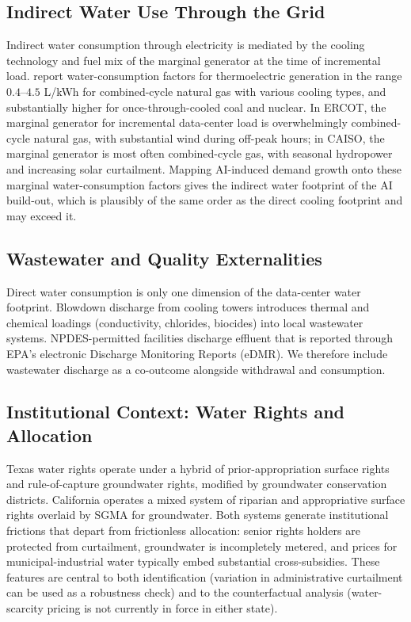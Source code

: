 \documentclass[11pt, letterpaper]{article}
\begin{document}
\subsection{Indirect Water Use Through the Grid}

Indirect water consumption through electricity is mediated by the cooling technology and fuel mix of the marginal generator at the time of incremental load. \citet{jin2019water} report water-consumption factors for thermoelectric generation in the range $0.4$--$4.5$ L/kWh for combined-cycle natural gas with various cooling types, and substantially higher for once-through-cooled coal and nuclear. In ERCOT, the marginal generator for incremental data-center load is overwhelmingly combined-cycle natural gas, with substantial wind during off-peak hours; in CAISO, the marginal generator is most often combined-cycle gas, with seasonal hydropower and increasing solar curtailment. Mapping AI-induced demand growth onto these marginal water-consumption factors gives the indirect water footprint of the AI build-out, which is plausibly of the same order as the direct cooling footprint and may exceed it.

\subsection{Wastewater and Quality Externalities}

Direct water consumption is only one dimension of the data-center water footprint. Blowdown discharge from cooling towers introduces thermal and chemical loadings (conductivity, chlorides, biocides) into local wastewater systems. NPDES-permitted facilities discharge effluent that is reported through EPA's electronic Discharge Monitoring Reports (eDMR). We therefore include wastewater discharge as a co-outcome alongside withdrawal and consumption.

\subsection{Institutional Context: Water Rights and Allocation}

Texas water rights operate under a hybrid of prior-appropriation surface rights and rule-of-capture groundwater rights, modified by groundwater conservation districts. California operates a mixed system of riparian and appropriative surface rights overlaid by SGMA for groundwater. Both systems generate institutional frictions that depart from frictionless allocation: senior rights holders are protected from curtailment, groundwater is incompletely metered, and prices for municipal-industrial water typically embed substantial cross-subsidies. These features are central to both identification (variation in administrative curtailment can be used as a robustness check) and to the counterfactual analysis (water-scarcity pricing is not currently in force in either state).
\end{document}
